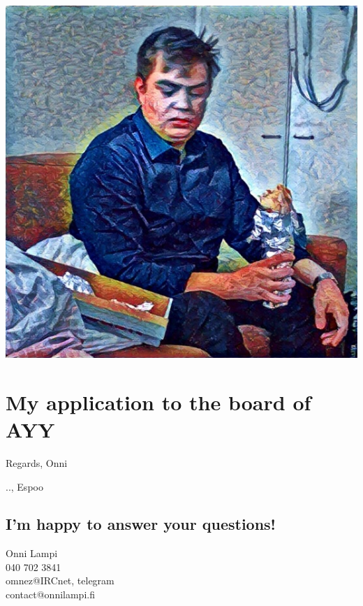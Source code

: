 \documentclass[a4paper, 12pt, english]{report}
\newcommand{\topic}{My application to the board of AYY}
\newcommand*{\findate}{\the\day.\the\month.\the\year}
\begin{document}
\includegraphics{Onni.jpg}
\section*{\topic}


Regards, Onni

\findate, Espoo

\subsection*{I'm happy to answer your questions!}
Onni Lampi\\
040 702 3841\\
omnez@IRCnet, telegram\\
contact@onnilampi.fi
\end{document}
